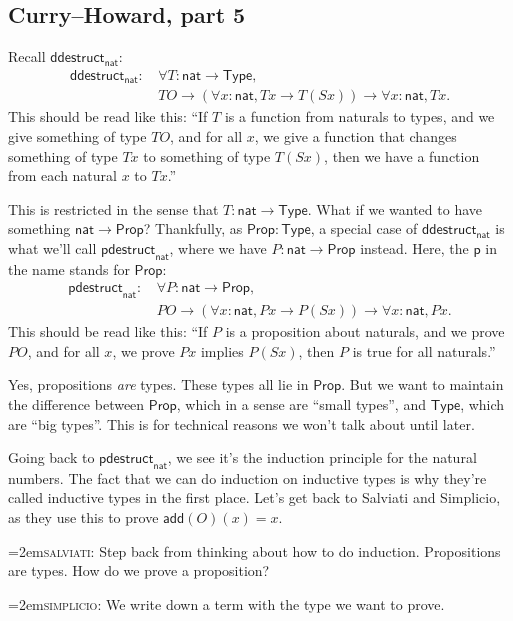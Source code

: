 \documentclass[11pt,paper=letter]{scrartcl}
\newcommand{\sf}{\mathsf}
\newcommand{\simp}{\vspace{0.5em}\noindent\hangindent=2em\textsc{simplicio:} }
\newcommand{\salv}{\vspace{0.5em}\noindent\hangindent=2em\textsc{salviati:} }
\newcommand{\prop}{\mathsf{Prop}}
\newcommand{\type}{\mathsf{Type}}
\begin{document}
\subsection{Curry--Howard, part 5}

Recall $\sf{ddestruct}_\sf{nat}$:
\begin{align*}
\sf{ddestruct}_{\sf{nat}}:\,
& \forall T: \sf{nat} \to \type,\\
&TO \to (\forall x: \sf{nat}, Tx \to T(Sx)) \to \forall x: \sf{nat}, Tx.
\end{align*}
This should be read like this: ``If $T$ is a function from naturals to types, and we give something of type $TO$, and for all $x$, we give a function that changes something of type $Tx$ to something of type $T(Sx)$, then we have a function from each natural $x$ to $Tx$.''

This is restricted in the sense that $T: \sf{nat} \to \type$. What if we wanted to have something $\sf{nat} \to \prop$? Thankfully, as $\prop: \type$, a special case of $\sf{ddestruct}_\sf{nat}$ is what we'll call $\sf{pdestruct}_\sf{nat}$, where we have $P: \sf{nat} \to\prop$ instead. Here, the $\sf{p}$ in the name stands for $\prop$:
\begin{align*}
\sf{pdestruct}_{\sf{nat}}:\,
& \forall P: \sf{nat} \to \prop,\\
&PO \to (\forall x: \sf{nat}, Px \to P(Sx)) \to \forall x: \sf{nat}, Px.
\end{align*}
This should be read like this: ``If $P$ is a proposition about naturals, and we prove $PO$, and for all $x$, we prove $Px$ implies $P(Sx)$, then $P$ is true for all naturals.''

Yes, propositions \emph{are} types. These types all lie in $\prop$. But we want to maintain the difference between $\prop$, which in a sense are ``small types'', and $\type$, which are ``big types''. This is for technical reasons we won't talk about until later.

Going back to $\sf{pdestruct}_{\sf{nat}}$, we see it's the induction principle for the natural numbers. The fact that we can do induction on inductive types is why they're called inductive types in the first place. Let's get back to Salviati and Simplicio, as they use this to prove $\sf{add}(O)(x) = x$.

\salv Step back from thinking about how to do induction. Propositions are types. How do we prove a proposition?

\simp We write down a term with the type we want to prove.
\end{document}
